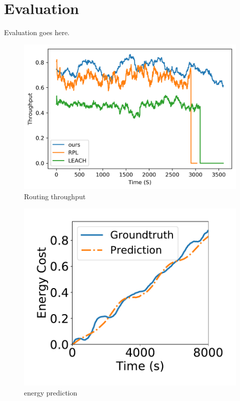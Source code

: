 \section{Evaluation}
\label{Eva}

Evaluation goes here.

\begin{figure}[htbp]
	\centering
	\includegraphics[width=.85\columnwidth]{Figure/throughput}
	\vspace{-0.1in}
	\caption{Routing throughput}
	\label{throughtput}
	\vspace{-0.2in}
\end{figure}
\begin{figure}[htbp]
	\centering
	\includegraphics[width=.85\columnwidth]{Figure/energy_pred}
	\vspace{-0.1in}
	\caption{energy prediction}
	\label{energy_pred}
	\vspace{-0.2in}
\end{figure}
